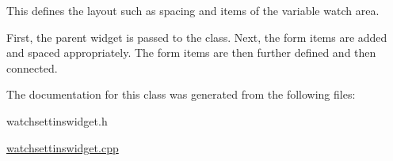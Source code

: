 This defines the layout such as spacing and items of the variable watch area. 

First, the parent widget is passed to the class. Next, the form items are added and spaced appropriately. The form items are then further defined and then connected. 

The documentation for this class was generated from the following files\+:\begin{DoxyCompactItemize}
\item 
watchsettinswidget.\+h\item 
\hyperlink{watchsettinswidget_8cpp}{watchsettinswidget.\+cpp}\end{DoxyCompactItemize}
